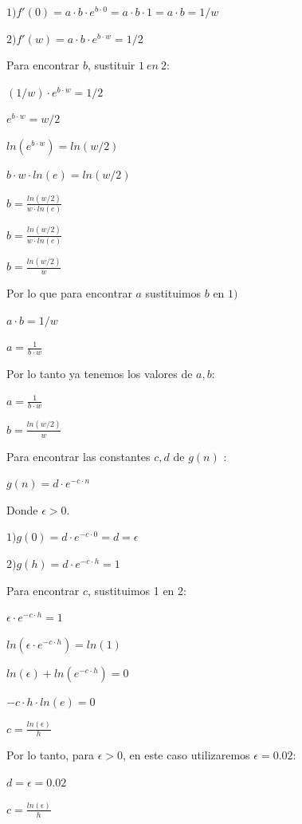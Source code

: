 \documentclass[conference]{IEEEtran}
\def\shadowLine{\vspace{3mm}}
\begin{document}
$1)f'(0) = a\cdot b\cdot e^{b\cdot 0} = a\cdot b \cdot 1= a\cdot b = 1/w$

$2)f'(w) = a\cdot b\cdot e^{b\cdot w} = 1/2$

Para encontrar $b$, sustituir $1\ en\ 2$:

$(1/w)\cdot e^{b\cdot w} = 1/2$

\shadowLine
$e^{b\cdot w} = w/2$

\shadowLine
$ln(e^{b\cdot w}) = ln(w/2)$

\shadowLine
$b\cdot w\cdot ln(e) = ln(w/2)$

\shadowLine
$b = \displaystyle\frac{ln(w/2)}{w\cdot ln(e)}  $

\shadowLine
$b = \displaystyle\frac{ln(w/2)}{w\cdot ln(e)}  $

\shadowLine
$b = \displaystyle\frac{ln(w/2)}{w}  $

Por lo que para encontrar $a$ sustituimos $b$ en $1)$

$a\cdot b = 1/w$

\shadowLine
$a = \displaystyle\frac{1}{b\cdot w}$

Por lo tanto ya tenemos los valores de $a, b$:

$a = \displaystyle\frac{1}{b\cdot w}$

\shadowLine
$b = \displaystyle\frac{ln(w/2)}{w}$

Para encontrar las constantes $c,d$ de $g(n)$ :

\shadowLine
$g(n)=d\cdot e^{-c\cdot n}$

Donde $\epsilon>0$.

\shadowLine
$1)g(0)=d\cdot e^{-c\cdot 0} = d = \epsilon$

\shadowLine
$2)g(h)=d\cdot e^{-c\cdot h} = 1$

Para encontrar $c$, sustituimos 1 en 2:

$\epsilon\cdot e^{-c\cdot h}=1$

\shadowLine
$ln(\epsilon\cdot e^{-c\cdot h})=ln(1)$

\shadowLine
$ln(\epsilon) + ln(e^{-c\cdot h})=0$

\shadowLine
$-c\cdot h\cdot ln(e)=0$

\shadowLine
$c = \displaystyle\frac{ln(\epsilon)}{h}$

Por lo tanto, para $\epsilon>0$, en este caso utilizaremos $\epsilon = 0.02$:

$d = \epsilon = 0.02$

\shadowLine
$c = \displaystyle\frac{ln(\epsilon)}{h}$
\end{document}
